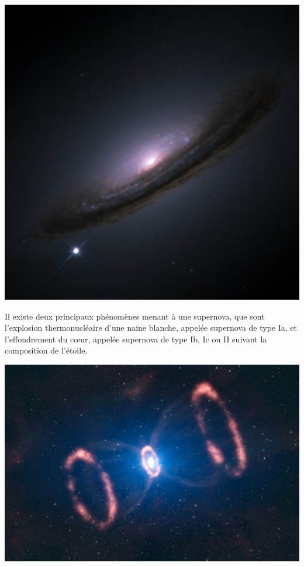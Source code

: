 \documentclass[11pt]{book} %
\begin{document}
\begin{minipage}{0.3\textwidth}
    \includegraphics[width=1\textwidth]{Pictures/SN1994D.jpg}
\end{minipage}
\hspace{0.025\textwidth}
\begin{minipage}{0.35\textwidth}
    Il existe deux principaux phénomènes menant à une supernova, que sont l'explosion thermonucléaire d'une naine blanche, appelée supernova de type Ia, et l'effondrement du c{\oe}ur, appelée supernova de type Ib, Ic ou II suivant la composition de l'étoile. \cite{sup}
\end{minipage}
\hspace{0.025\textwidth}
\begin{minipage}{0.3\textwidth}
    \includegraphics[width=1\textwidth]{Pictures/SN1987A.jpg}
\end{minipage}
\end{document}
